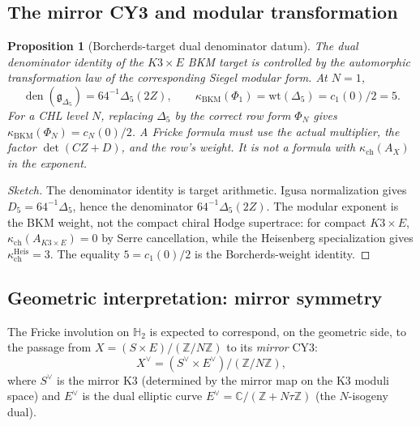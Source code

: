 \documentclass[11pt]{article}
\newtheorem{proposition}[theorem]{Proposition}
\theoremstyle{definition}
\theoremstyle{remark}
\newcommand{\fkg}{\mathfrak{g}}
\newcommand{\bC}{\mathbb{C}}
\newcommand{\bH}{\mathbb{H}}
\newcommand{\bZ}{\mathbb{Z}}
\begin{document}
\subsection{The mirror CY3 and modular transformation}

\begin{proposition}[Borcherds-target dual denominator datum]
\label{prop:k3e-koszul-denominator}
The dual denominator identity of the $K3\times E$ BKM target is
controlled by the automorphic transformation law of the corresponding
Siegel modular form. At $N=1$,
\[
 \operatorname{den}(\fkg_{\Delta_5})=64^{-1}\Delta_5(2Z),
 \qquad
 \kappa_{\mathrm{BKM}}(\Phi_1)=\mathrm{wt}(\Delta_5)=c_1(0)/2=5 .
\]
For a CHL level $N$, replacing $\Delta_5$ by the correct row form
$\Phi_N$ gives $\kappa_{\mathrm{BKM}}(\Phi_N)=c_N(0)/2$. A Fricke
formula must use the actual multiplier, the factor $\det(CZ+D)$, and
the row's weight. It is not a formula with
$\kappa_{\mathrm{ch}}(A_X)$ in the exponent.
\end{proposition}

\begin{proof}[Sketch]
The denominator identity is target arithmetic. Igusa normalization gives
$D_5=64^{-1}\Delta_5$, hence the denominator
$64^{-1}\Delta_5(2Z)$. The modular exponent is the BKM weight,
not the compact chiral Hodge supertrace: for compact $K3\times E$,
$\kappa_{\mathrm{ch}}(A_{K3\times E})=0$ by Serre cancellation, while
the Heisenberg specialization gives $\kappa_{\mathrm{ch}}^{\mathrm{Heis}}=3$.
The equality $5=c_1(0)/2$ is the Borcherds-weight identity.
\end{proof}

\subsection{Geometric interpretation: mirror symmetry}

The Fricke involution on $\bH_2$ is expected to correspond, on the
geometric side, to the passage from $X = (S \times E)/(\bZ/N\bZ)$ to its
\emph{mirror} CY3:
\[
X^\vee = (S^\vee \times E^\vee) / (\bZ/N\bZ),
\]
where $S^\vee$ is the mirror K3 (determined by the mirror map on
the K3 moduli space) and $E^\vee$ is the dual elliptic curve
$E^\vee = \bC / (\bZ + N\tau \bZ)$ (the $N$-isogeny dual).
\end{document}
